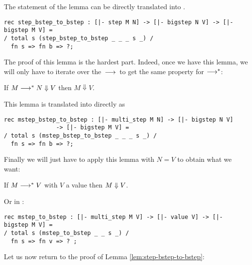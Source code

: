 The statement of the lemma can be directly translated into \beluga.

\begin{lstlisting}
rec step_bstep_to_bstep : [|- step M N] -> [|- bigstep N V] -> [|- bigstep M V] =
/ total s (step_bstep_to_bstep _ _ _ s _) /
  fn s => fn b => ?;
\end{lstlisting} 

The proof of this lemma is the hardest part. Indeed, once we have this lemma, we will only
have to iterate over the $\mathrel{\,\longrightarrow\,}$ to get the same property for $\longrightarrow^*$:

\begin{lemma}\label{lem:mstep-bstep-to-bstep}
  If $M \longrightarrow^* N \Downarrow V$ then $M \Downarrow V$.
\end{lemma}

This lemma is translated into \beluga directly as

  \begin{lstlisting}
rec mstep_bstep_to_bstep : [|- multi_step M N] -> [|- bigstep N V]
			   -> [|- bigstep M V] =
/ total s (mstep_bstep_to_bstep _ _ _ s _) /
  fn s => fn b => ?;
  \end{lstlisting}

Finally we will just have to apply this lemma with $N = V$ to obtain what we
want:

\begin{proposition}\label{prop:mstep-to-bstep}
  If $M \longrightarrow^* V$ with $V$ a value then $M \Downarrow V$.
\end{proposition}

Or in \beluga: 

\begin{lstlisting}
rec mstep_to_bstep : [|- multi_step M V] -> [|- value V] -> [|- bigstep M V] =
/ total s (mstep_to_bstep _ _ s _) /
  fn s => fn v => ? ;
\end{lstlisting}


Let us now return to the proof of Lemma \ref{lem:step-bstep-to-bstep}:

